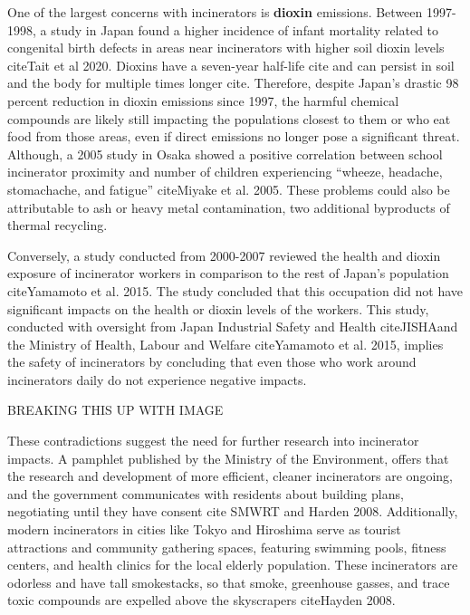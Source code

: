 \documentclass{book}\usepackage{knitr}
\begin{document}
One of the largest concerns with incinerators is \textbf{dioxin} emissions. Between 1997-1998, a study in Japan found a higher incidence of infant mortality related to congenital birth defects in areas near incinerators with higher soil dioxin levels citeTait et al 2020. Dioxins have a seven-year half-life cite and can persist in soil and the body for multiple times longer cite. Therefore, despite Japan's drastic 98 percent reduction in dioxin emissions since 1997, the harmful chemical compounds are likely still impacting the populations closest to them or who eat food from those areas, even if direct emissions no longer pose a significant threat. Although, a 2005 study in Osaka showed a positive correlation between school incinerator proximity and number of children experiencing ``wheeze, headache, stomachache, and fatigue'' citeMiyake et al. 2005. These problems could also be attributable to ash or heavy metal contamination, two additional byproducts of thermal recycling.

Conversely, a study conducted from 2000-2007 reviewed the health and dioxin exposure of incinerator workers in comparison to the rest of Japan’s population citeYamamoto et al. 2015. The study concluded that this occupation did not have significant impacts on the health or dioxin levels of the workers. This study, conducted with oversight from Japan Industrial Safety and Health citeJISHAand the Ministry of Health, Labour and Welfare citeYamamoto et al. 2015, implies the safety of incinerators by concluding that even those who work around incinerators daily do not experience negative impacts.

BREAKING THIS UP WITH IMAGE

These contradictions suggest the need for further research into incinerator impacts. A pamphlet published by the Ministry of the Environment, offers that the research and development of more efficient, cleaner incinerators are ongoing, and the government communicates with residents about building plans, negotiating until they have consent cite SMWRT and Harden 2008. Additionally, modern incinerators in cities like Tokyo and Hiroshima serve as tourist attractions and community gathering spaces, featuring swimming pools, fitness centers, and health clinics for the local elderly population. These incinerators are odorless and have tall smokestacks, so that smoke, greenhouse gasses, and trace toxic compounds are expelled above the skyscrapers citeHayden 2008. 
\end{document}
